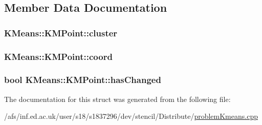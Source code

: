 \subsection{Member Data Documentation}
\hypertarget{structKMeans_1_1KMPoint_a408c13908634cfcef55d6ff8457adb6b}{
\subsubsection[{cluster}]{ K\-Means\-::\-K\-M\-Point\-::cluster}}\label{structKMeans_1_1KMPoint_a408c13908634cfcef55d6ff8457adb6b}
\hypertarget{structKMeans_1_1KMPoint_a403beb1516f02ed1ba0aeca37ba468fa}{
\subsubsection[{coord}]{ K\-Means\-::\-K\-M\-Point\-::coord}}\label{structKMeans_1_1KMPoint_a403beb1516f02ed1ba0aeca37ba468fa}
\hypertarget{structKMeans_1_1KMPoint_a1408906e8776055f7545667fddbbe7cb}{
\subsubsection[{has\-Changed}]{\setlength{\rightskip}{0pt plus 5cm}bool K\-Means\-::\-K\-M\-Point\-::has\-Changed}}\label{structKMeans_1_1KMPoint_a1408906e8776055f7545667fddbbe7cb}


The documentation for this struct was generated from the following file\-:\begin{DoxyCompactItemize}
\item 
/afs/inf.\-ed.\-ac.\-uk/user/s18/s1837296/dev/stencil/\-Distribute/\hyperlink{problemKmeans_8cpp}{problem\-Kmeans.\-cpp}\end{DoxyCompactItemize}

